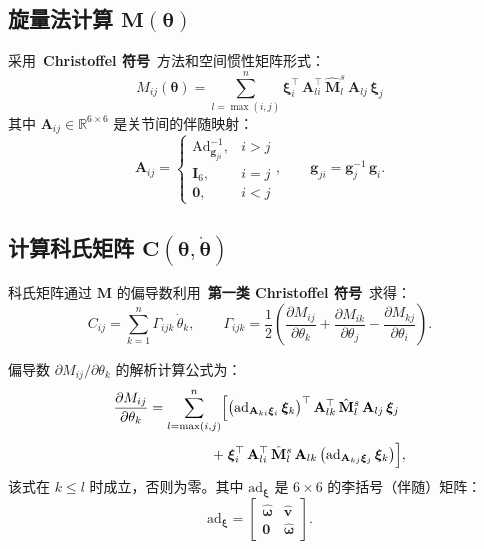 \documentclass[12pt,a4paper]{ctexart}
\begin{document}
\subsection{\texorpdfstring{旋量法计算 $\mathbf{M}(\bm{\theta})$}{旋量法计算 M(theta)}}

采用\ \textbf{Christoffel 符号}\ 方法和空间惯性矩阵形式：
\[
M_{ij}(\bm{\theta}) = \sum_{l = \max(i,j)}^{n} \bm{\xi}_i^\top\,\mathbf{A}_{li}^\top\,
\hat{\mathbf{M}}_l^s\,\mathbf{A}_{lj}\,\bm{\xi}_j
\]
其中 $\mathbf{A}_{ij} \in \mathbb{R}^{6\times 6}$ 是关节间的伴随映射：
\[
\mathbf{A}_{ij} = \begin{cases}
\mathrm{Ad}^{-1}_{\mathbf{g}_{ji}}, & i > j \\[3pt]
\mathbf{I}_6, & i = j \\[3pt]
\mathbf{0}, & i < j
\end{cases},\qquad
\mathbf{g}_{ji} = \mathbf{g}_j^{-1}\,\mathbf{g}_i.
\]

\subsection{\texorpdfstring{计算科氏矩阵 $\mathbf{C}(\bm{\theta},\dot{\bm{\theta}})$}{计算科氏矩阵 C(theta, dtheta)}}

科氏矩阵通过 $\mathbf{M}$ 的偏导数利用\ \textbf{第一类 Christoffel 符号}\ 求得：
\[
C_{ij} = \sum_{k=1}^{n} \Gamma_{ijk}\,\dot{\theta}_k,\qquad
\Gamma_{ijk} = \frac{1}{2}\left(
\frac{\partial M_{ij}}{\partial\theta_k} +
\frac{\partial M_{ik}}{\partial\theta_j} -
\frac{\partial M_{kj}}{\partial\theta_i}
\right).
\]

偏导数 $\partial M_{ij}/\partial\theta_k$ 的解析计算公式为：
\begin{align*}
\frac{\partial M_{ij}}{\partial\theta_k} = \sum_{l=\max(i,j)}^{n}
\Bigl[
&\bigl(\mathrm{ad}_{\mathbf{A}_{ki}\bm{\xi}_i}\,\bm{\xi}_k\bigr)^\top\,
\mathbf{A}_{lk}^\top\,\hat{\mathbf{M}}_l^s\,\mathbf{A}_{lj}\,\bm{\xi}_j \\[3pt]
+\;&\bm{\xi}_i^\top\,\mathbf{A}_{li}^\top\,\hat{\mathbf{M}}_l^s\,
\mathbf{A}_{lk}\,\bigl(\mathrm{ad}_{\mathbf{A}_{kj}\bm{\xi}_j}\,\bm{\xi}_k\bigr)
\Bigr],
\end{align*}
该式在 $k \le l$ 时成立，否则为零。其中 $\mathrm{ad}_{\bm{\xi}}$ 是 $6\times 6$ 的李括号（伴随）矩阵：
\[
\mathrm{ad}_{\bm{\xi}} = \begin{bmatrix}
\hat{\bm{\omega}} & \hat{\mathbf{v}} \\
\mathbf{0} & \hat{\bm{\omega}}
\end{bmatrix}.
\]
\end{document}
